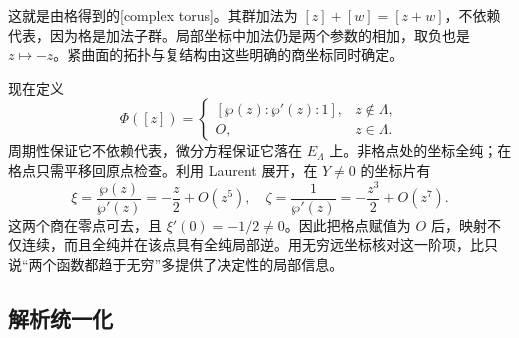 这就是由格得到的[complex torus]。其群加法为 \([z]+[w]=[z+w]\)，不依赖代表，因为格是加法子群。局部坐标中加法仍是两个参数的相加，取负也是 \(z\mapsto-z\)。紧曲面的拓扑与复结构由这些明确的商坐标同时确定。

\ProseParagraphBreak

现在定义
\[
 \Phi([z])=
 \begin{cases}
 [\wp(z):\wp'(z):1],&z\notin\Lambda,\\
 O,&z\in\Lambda.
 \end{cases}
\]
周期性保证它不依赖代表，微分方程保证它落在 \(E_\Lambda\) 上。非格点处的坐标全纯；在格点只需平移回原点检查。利用 Laurent 展开，在 \(Y\ne0\) 的坐标片有
\begin{equation}\label{b3:eq:22-parametrization-infinity}
 \xi=\frac{\wp(z)}{\wp'(z)}=-\frac z2+O(z^5),\quad
 \zeta=\frac1{\wp'(z)}=-\frac{z^3}2+O(z^7).
\end{equation}
这两个商在零点可去，且 \(\xi'(0)=-1/2\ne0\)。因此把格点赋值为 \(O\) 后，映射不仅连续，而且全纯并在该点具有全纯局部逆。用无穷远坐标核对这一阶项，比只说“两个函数都趋于无穷”多提供了决定性的局部信息。

\subsection{解析统一化}
\label{b3:subsec:220404}

